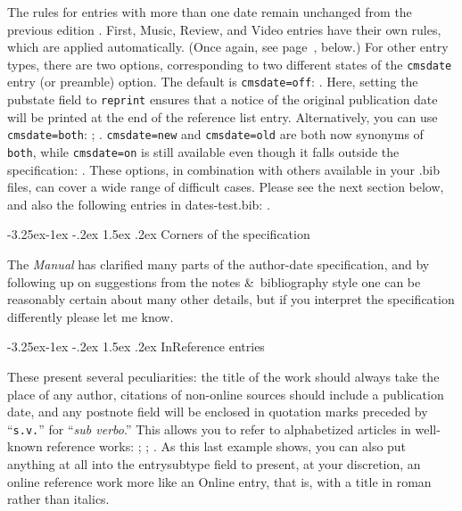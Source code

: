 \documentclass[a4paper,12pt]{article}
\makeatletter
\renewcommand{\section}{\@startsection{section}{1}{\z@}%
                                     {-3.25ex\@plus -1ex \@minus -.2ex}%
                                     {1.5ex \@plus .2ex}%
                                     {\normalfont\large\bfseries}}
\renewcommand{\subsection}{\@startsection{subsection}{2}{\z@}%
                                     {-3.25ex\@plus -1ex \@minus -.2ex}%
                                     {1.5ex \@plus .2ex}%
                                     {\normalfont\normalsize\bfseries}}
\makeatother
\begin{document}
The rules for entries with more than one date remain unchanged from
the previous edition \autocite[15.40]{chicago:manual}.  First,
\textsf{Music}, \textsf{Review}, and \textsf{Video} entries have their
own rules, which are applied automatically.  (Once again, see
page~\pageref{sec:audiovisual}, below.)  For other entry types, there
are two options, corresponding to two different states of the
\texttt{cmsdate} entry (or preamble) option.  The default is
\texttt{cmsdate=off}: \autocite{maitland:equity}.  Here, setting the
\textsf{pubstate} field to \texttt{reprint} ensures that a notice of
the original publication date will be printed at the end of the
reference list entry.  Alternatively, you can use
\texttt{cmsdate=both}: \autocite{emerson:nature};
\autocite{maitland:canon}.  \texttt{cmsdate=new} and
\texttt{cmsdate=old} are both now synonyms of \texttt{both}, while
\texttt{cmsdate=on} is still available even though it falls outside
the specification: \autocite{james:ambassadors}.  These options, in
combination with others available in your .bib files, can cover a wide
range of difficult cases.  Please see the next section below, and also
the following entries in \textsf{dates-test.bib}:
\autocites{schweitzer:bach}{white:russ}{white:ross:memo}.

\section{Corners of the specification}
\label{sec:corners}

The \emph{Manual} has clarified many parts of the author-date
specification, and by following up on suggestions from the notes \&\
bibliography style one can be reasonably certain about many other
details, but if you interpret the specification differently please let
me know.

\subsection{InReference entries}
\label{sec:inref}

These present  several
peculiarities: the title of the work should always take the place of
any author, citations of non-online sources should include a
publication date, and any postnote field will be enclosed in quotation
marks preceded by \enquote{\texttt{s.v.}\hspace{-2pt}} for
\enquote{\emph{sub verbo}.}  This allows you to refer to alphabetized
articles in well-known reference works: \autocite[Hume,
David]{ency:britannica}; \autocite[Sibelius, Jean]{grove:sibelius};
\autocite[BibTeX]{wikiped:bibtex}.  As this last example shows, you
can also put anything at all into the \textsf{entrysubtype} field to
present, at your discretion, an online reference work more like an
\textsf{Online} entry, that is, with a \textsf{title} in roman rather
than italics.
\end{document}
